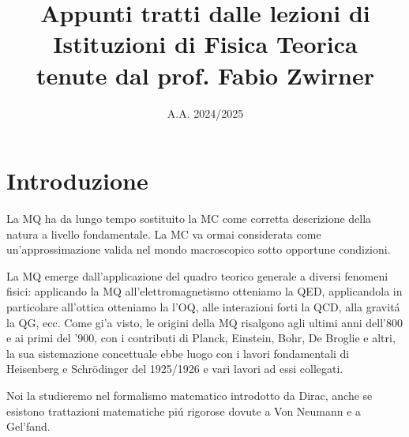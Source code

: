 \documentclass[a4paper]{article}
\numberwithin{equation}{section}
\begin{document}
\title{Appunti tratti dalle lezioni di \\[3em]
	\textbf{\Huge Istituzioni di Fisica Teorica} \\[3em]
	tenute dal prof. Fabio Zwirner}

\date{A.A. 2024/2025}

\maketitle

\newpage
\vspace*{0pt}
\newpage

\hypersetup{linkcolor=black}
\tableofcontents

\newpage


	
\vspace{5em}

\section*{\huge Introduzione}

La MQ ha da lungo tempo sostituito la MC come corretta descrizione della natura a livello fondamentale. La MC va ormai considerata come un'approssimazione valida nel mondo macroscopico sotto opportune condizioni.

La MQ emerge dall'applicazione del quadro teorico generale a diversi fenomeni fisici: applicando la MQ
all'elettromagnetismo otteniamo la QED, applicandola in particolare all'ottica otteniamo la l'OQ, alle interazioni forti la QCD, alla gravit\'a la QG, ecc. Come gi'a visto, le origini della MQ risalgono agli ultimi anni dell'800 e ai primi del '900, con i contributi di Planck, Einstein, Bohr, De Broglie e altri, la sua sistemazione concettuale ebbe luogo con i lavori fondamentali di Heisenberg e Schr\"odinger del 1925/1926 e vari lavori ad essi collegati.

Noi la studieremo nel formalismo matematico introdotto da Dirac, anche se esistono trattazioni matematiche pi\'u rigorose dovute a Von Neumann e a Gel'fand.
\end{document}
